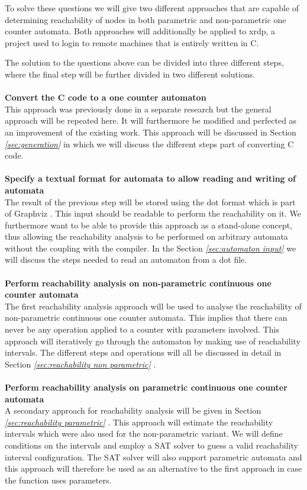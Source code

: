 \documentclass[12pt]{thesis}
\begin{document}
To solve these questions we will give two different approaches that are capable of determining reachability of nodes in both parametric and non-parametric one counter automata. Both approaches will additionally be applied to xrdp, a project used to login to remote machines that is entirely written in C. 

The solution to the questions above can be divided into three different steps, where the final step will be further divided in two different solutions.\\
\\
\noindent
\textbf{Convert the C code to a one counter automaton} \\
This approach was previously done in a separate research but the general approach will be repeated here. It will furthermore be modified and perfected as an improvement of the existing work. This approach will be discussed in Section \textit{\ref{sec:generation} } in which we will discuss the different steps part of converting C code.\\
\\
\noindent
\textbf{Specify a textual format for automata to allow reading and writing of automata}\\
The result of the previous step will be stored using the dot format which is part of Graphviz \cite{10.1007/3-540-45848-4_57}. This input should be readable to perform the reachability on it. We furthermore want to be able to provide this approach as a stand-alone concept, thus allowing the reachability analysis to be performed on arbitrary automata without the coupling with the compiler. In the Section \textit{\ref{sec:automaton input} } we will discuss the steps needed to read an automaton from a dot file.\\
\\
\noindent
\textbf{Perform reachability analysis on non-parametric continuous one counter automata} \\
The first reachability analysis approach will be used to analyse the reachability of non-parametric continuous one counter automata. This implies that there can never be any operation applied to a counter with parameters involved. This approach will iteratively go through the automaton by making use of reachability intervals. The different steps and operations will all be discussed in detail in Section \textit{\ref{sec:reachability non parametric} }.\\
\\
\noindent
\textbf{Perform reachability analysis on parametric continuous one counter automata} \\
A secondary approach for reachability analysis will be given in Section \textit{\ref{sec:reachability parametric} }. This approach will estimate the reachability intervals which were also used for the non-parametric variant. We will define conditions on the intervals and employ a SAT solver to guess a valid reachability interval configuration. The SAT solver will also support parametric automata and this approach will therefore be used as an alternative to the first approach in case the function uses parameters.
\end{document}
